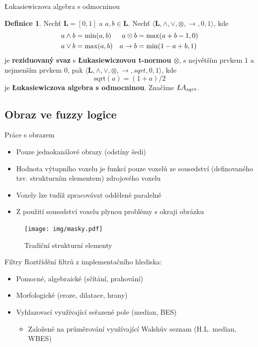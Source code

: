 \documentclass[compress,mathserif]{beamer}
\theoremstyle{definition}
\newtheorem{define}{Definice}
\theoremstyle{plain}
\newcommand{\beI}{\begin{itemize}}
\newcommand{\enI}{\end{itemize}}
\newcommand{\bL}{\mathbf{L}}
\begin{document}
     \begin{frame}{\L ukasiewiczova algebra s odmocninou}
        \begin{define}
            Nechť $\bL = [0,1]$ a $a,b \in \bL$. Nechť $\langle\bL,\wedge,\vee,\otimes,
            \rightarrow,0,1\rangle$, kde
            \begin{align}
                 a \wedge b &= \min(a,b) & a \otimes b &= \max(a+b-1,0)\notag\\
                 a \vee b &= \max(a,b) &  a \rightarrow b &= \min(1-a+b,1)\notag
            \end{align}
            je \textbf{reziduovaný svaz} s \textbf{\L ukasiewiczovou
            t-normou $\otimes$}, s největším prvkem 1 a nejmenším prvkem 0,
            pak $\langle\bL,\wedge,\vee,\otimes,\rightarrow,sqrt,0,1\rangle$, kde
                 $$\mathrm{sqrt}(a) = (1+a)/2$$
            je \textbf{\L ukasiewiczova algebra s odmocninou}. Značíme ${\textit\L} A_{sqrt}$.
        \end{define}
    \end{frame}
    
    \subsection{Obraz ve fuzzy logice}
     \begin{frame}{Práce s obrazem}
        \beI
            \item Pouze jednokanálové obrazy (odstíny šedi)
            \item Hodnota výtupního voxelu je funkcí pouze voxelů ze sousedství 
                (definovaného tzv. strukturním elementem) zdrojového voxelu
            \item Voxely lze tudíž zpracovávat odděleně paralelně
            \item Z použití sousedství voxelu plynou problémy s okraji obrázku
        \enI
            \begin{figure}[h]
              \texttt{[image: img/masky.pdf]}
              \caption{Tradiční strukturní elementy}
            \end{figure}
     \end{frame}
        
     
     \begin{frame}{Filtry}
        Roztřídění filtrů z implementačního hlediska:
        \beI
            \item Pomocné, algebraické (sčítání, prahování)
            \item Morfologické (eroze, dilatace, hrany)
            \item Vyhlazovací využívající seřazené pole (median, BES)
            \beI
                \item Založené na průměrování využívající Walshův seznam (H.L. median, WBES)
            \enI
        \enI
    \end{frame}
    
\end{document}
